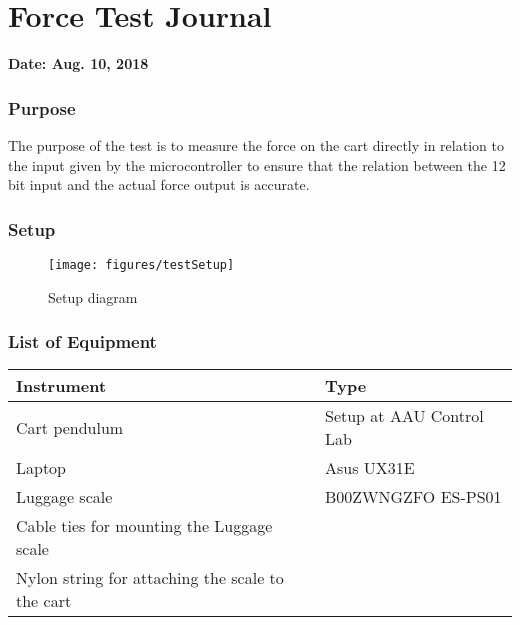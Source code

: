 \section{Force Test Journal} \label{forceTestJournal} %
\textbf{Date: Aug. 10, 2018}

\subsubsection{Purpose}
The purpose of the test is to measure the force on the cart directly in relation to the input given by the microcontroller to ensure that the relation between the 12 bit input and the actual force output is accurate.

\subsubsection{Setup}
\begin{figure}[H]
	\texttt{[image: figures/testSetup]}
	\caption{Setup diagram}
  \label{testSetup}
\end{figure}

\subsubsection{List of Equipment}
\begin{table}[H]
\begin{tabular}{|l|l|}
\hline%
  \textbf{Instrument}                        &   \textbf{Type}                           \\
\hline%
  Cart pendulum                              &   Setup at AAU Control Lab                \\
\hline%
   Laptop             	     	               &   Asus UX31E                              \\
\hline%
   Luggage scale                             &   B00ZWNGZFO ES-PS01                      \\
\hline%
  Cable ties for mounting the Luggage scale  &                                           \\
\hline%
   Nylon string for attaching the scale to the cart  &                                   \\
\hline%
\end{tabular}
\end{table}

